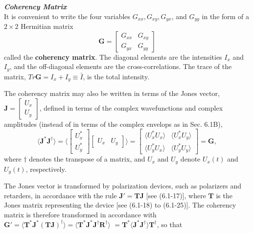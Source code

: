 \documentclass{article}
\numberwithin{figure}{subsection}
\numberwithin{table}{subsection}
\begin{document}
\bigbreak\noindent\textcolor{ksc}{\textbf{\textsl{Coherency Matrix}}}\\
It is convenient to write the four variables $G_{xx}, G_{xy}, G_{yx}$, and $G_{yy}$ in the form of a $2 \times 2$ Hermitian matrix
\begin{equation}
\mathbf{G} = 
\begin{bmatrix}
G_{xx} & G_{xy} \\
G_{yx} & G_{yy}
\end{bmatrix}
\end{equation}
called the \textbf{coherency matrix}. The diagonal elements are the intensities $I_x$ and $I_y$, and the off-diagonal elements are the cross-correlations. The trace of the matrix, $Tr\mathbf{G} = I_x + I_y  \equiv \bar{I}$, is the total intensity.
\par The coherency matrix may also be written in terms of the Jones vector, $\mathbf{J} = \begin{bmatrix}U_x \\ U_y \end{bmatrix}$, defined in terms of the complex wavefunctions and complex amplitudes (instead of in terms of the complex envelops as in Sec. 6.1B),
\begin{equation}
\langle \mathbf{J}^\ast \mathbf{J}^{\dag} \rangle = \langle 
\begin{bmatrix}
U_x^\ast \\
U_y^\ast
\end{bmatrix}
\begin{bmatrix}
U_x & U_y
\end{bmatrix}
\rangle =
\begin{bmatrix}
\langle U_x^\ast U_x \rangle & \langle U_x^\ast U_y \rangle \\
\langle U_y^\ast U_x \rangle & \langle U_y^\ast U_y \rangle 
\end{bmatrix}
= \mathbf{G} ,
\end{equation}
where $\dag$ denotes the transpose of a matrix, and $U_x$ and $U_y$ denote $U_x (t)$ and $U_y (t)$, respectively.
\par The Jones vector is transformed by polarization devices, such as polarizers and retarders, in accordance with the rule $\mathbf{J' = TJ}$ [see (6.1-17)], where $\mathbf{T}$ is the Jones matrix representing the device [see (6.1-18) to (6.1-25)]. The coherency matrix is therefore transformed in accordance with $\mathbf{ G' = \langle T^\ast J^\ast (TJ)^\dag \rangle = \langle T^\ast J^\ast J^\dag R^\dag \rangle} $ $\mathbf{= T^\ast \langle J^\ast J^\dag \rangle T^\dag}$, so that
\end{document}
